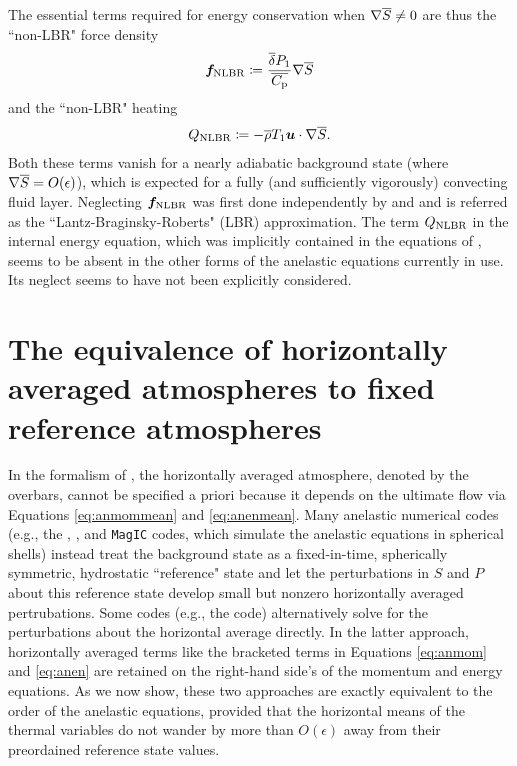 \documentclass[12pt]{article}
\begin{document}
The essential terms required for energy conservation when $\nabla\overline{S}\neq0$ are thus the ``non-LBR" force density
\begin{align}\label{eq:nlbrmom}
	\bm{f}_{\rm NLBR} \coloneqq \frac{\overline{\delta} P_1}{\overline{C_{\rm{p}}}} \nabla\overline{S}
\end{align}
and the ``non-LBR" heating
\begin{align}\label{eq:nlbrheat}
	Q_{\rm NLBR} \coloneqq -\overline{\rho} T_1\bm{u}\cdot\nabla\overline{S}.
\end{align}
Both these terms vanish for a nearly adiabatic background state (where $\nabla\overline{S}=O(\epsilon)$), which is expected for a fully (and sufficiently vigorously) convecting fluid layer.  Neglecting $\bm{f}_{\rm NLBR}$ was first done independently by \citet{Lantz1992} and \citet{Braginsky1995} and is referred as the ``Lantz-Braginsky-Roberts" (LBR) approximation. The term $Q_{\rm NLBR}$ in the internal energy equation, which was implicitly contained in the equations of \citet{Gough1969}, seems to be absent in the other forms of the anelastic equations currently in use. Its neglect seems to have not been explicitly considered. 

\section{The equivalence of horizontally averaged atmospheres to fixed reference atmospheres}\label{sec:meantoref}
In the formalism of \citet{Gough1969}, the horizontally averaged atmosphere, denoted by the overbars, cannot be specified a priori because it depends on the ultimate flow via Equations \eqref{eq:anmommean} and \eqref{eq:anenmean}. Many anelastic numerical codes (e.g., the {\rayleigh}, {\eulag}, and \texttt{MagIC} codes, which simulate the anelastic equations in spherical shells) instead treat the background state as a fixed-in-time, spherically symmetric, hydrostatic ``reference" state and let the perturbations in $S$ and $P$ about this reference state develop small but nonzero horizontally averaged pertrubations. Some codes (e.g., the {\ash} code) alternatively solve for the perturbations about the horizontal average directly. In the latter approach, horizontally averaged terms like the bracketed terms in Equations \eqref{eq:anmom} and \eqref{eq:anen} are retained on the right-hand side's of the momentum and energy equations. As we now show, these two approaches are exactly equivalent to the order of the anelastic equations, provided that the horizontal means of the thermal variables do not wander by more than $O(\epsilon)$ away from their preordained reference state values. 
\end{document}
